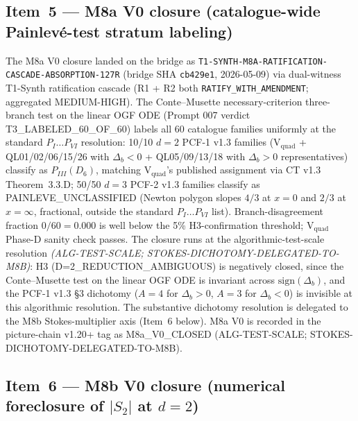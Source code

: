 \documentclass[11pt,a4paper]{article}
\theoremstyle{definition}
\theoremstyle{remark}
\begin{document}
\subsection{Item~5 --- M8a V0 closure (catalogue-wide Painlev\'e-test stratum labeling)}
\label{sec:closure-cascade-m8a}

The M8a V0 closure landed on the bridge as
\texttt{T1-SYNTH-M8A-RATIFICATION-CASCADE-ABSORPTION-127R} (bridge SHA
\texttt{cb429e1}, 2026-05-09) via dual-witness T1-Synth ratification
cascade (R1 + R2 both \verb|RATIFY_WITH_AMENDMENT|; aggregated
MEDIUM-HIGH). The Conte--Musette necessary-criterion three-branch
test on the linear OGF ODE (Prompt 007 verdict
\textsf{T3\_LABELED\_60\_OF\_60}) labels all 60 catalogue families
uniformly at the standard $P_I \ldots P_{VI}$ resolution: 10/10
$d=2$ PCF-1 v1.3 families (V$_{\mathrm{quad}}$ + QL01/02/06/15/26
with $\Delta_b<0$ + QL05/09/13/18 with $\Delta_b>0$ representatives)
classify as $P_{III}(D_6)$, matching V$_{\mathrm{quad}}$'s published
assignment via CT v1.3 Theorem~3.3.D; 50/50 $d=3$ PCF-2 v1.3
families classify as \textsf{PAINLEVE\_UNCLASSIFIED} (Newton polygon
slopes $4/3$ at $x=0$ and $2/3$ at $x=\infty$, fractional, outside
the standard $P_I \ldots P_{VI}$ list). Branch-disagreement fraction
$0/60 = 0.000$ is well below the 5\% H3-confirmation threshold;
V$_{\mathrm{quad}}$ Phase-D sanity check passes. The closure runs at
the algorithmic-test-scale resolution \emph{(ALG-TEST-SCALE; STOKES-DICHOTOMY-DELEGATED-TO-M8B)}: H3
(\textsf{D=2\_REDUCTION\_AMBIGUOUS}) is negatively closed, since the
Conte--Musette test on the linear OGF ODE is invariant across
$\mathrm{sign}(\Delta_b)$, and the PCF-1 v1.3 \S 3 dichotomy
($A=4$ for $\Delta_b>0$, $A=3$ for $\Delta_b<0$) is invisible at
this algorithmic resolution. The substantive dichotomy resolution is
delegated to the M8b Stokes-multiplier axis (Item~6 below). M8a V0
is recorded in the picture-chain v1.20+ tag as
\textsf{M8a\_V0\_CLOSED (ALG-TEST-SCALE; STOKES-DICHOTOMY-DELEGATED-TO-M8B)}.

\subsection{Item~6 --- M8b V0 closure (numerical foreclosure of $|S_2|$ at $d=2$)}
\label{sec:closure-cascade-m8b}
\end{document}
